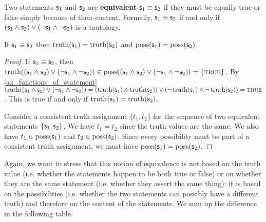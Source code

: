 \documentclass[11pt,letterpaper,fleqn]{memoir} %
\begin{document}
\begin{mathSection}

\begin{defn}
	Two statements $\mathsf{s}_1$ and $\mathsf{s}_2$ are \textbf{equivalent} $\mathsf{s}_1 \equiv \mathsf{s}_2$ if they must be equally true or false simply because of their content. Formally, $\mathsf{s}_1 \equiv \mathsf{s}_2$ if and only if $(\mathsf{s}_1 \wedge \mathsf{s}_2) \vee (\neg\mathsf{s}_1 \wedge \neg\mathsf{s}_2)$ is a tautology.
\end{defn}

\begin{coro}
	If $\mathsf{s}_1 \equiv \mathsf{s}_2$ then $\operatorname{truth}(\mathsf{s}_1) = \operatorname{truth}(\mathsf{s}_2)$ and $\operatorname{poss}(\mathsf{s}_1) = \operatorname{poss}(\mathsf{s}_2)$.
\end{coro}

\begin{proof}
	If $\mathsf{s}_1 \equiv \mathsf{s}_2$, then $\operatorname{truth}((\mathsf{s}_1 \wedge \mathsf{s}_2) \vee (\neg\mathsf{s}_1 \wedge \neg\mathsf{s}_2)) \in \operatorname{poss}((\mathsf{s}_1 \wedge \mathsf{s}_2) \vee (\neg\mathsf{s}_1 \wedge \neg\mathsf{s}_2)) = \{\textsc{true}\}$. By \ref{ax_functions_of_statement} $\operatorname{truth}((\mathsf{s}_1 \wedge \mathsf{s}_2) \vee (\neg\mathsf{s}_1 \wedge \neg\mathsf{s}_2))= (\operatorname{truth}(\mathsf{s}_1) \wedge \operatorname{truth}(\mathsf{s}_2) ) \vee (\neg\operatorname{truth}(\mathsf{s}_1) \wedge \neg\operatorname{truth}(\mathsf{s}_2)) = \textsc{true}$. This is true if and only if $\operatorname{truth}(\mathsf{s}_1) = \operatorname{truth}(\mathsf{s}_2)$.
	
	Consider a consistent truth assignment $\{t_1, t_2\}$ for the sequence of two equivalent statements $\{\mathsf{s}_1, \mathsf{s}_2\}$. We have $t_1=t_2$ since the truth values are the same. We also have $t_1 \in \operatorname{poss}(\mathsf{s}_1)$ and $t_2 \in \operatorname{poss}(\mathsf{s}_2)$. Since every possibility must be part of a consistent truth assignment, we must have $\operatorname{poss}(\mathsf{s}_1) = \operatorname{poss}(\mathsf{s}_2)$.
\end{proof}

\end{mathSection}

Again, we want to stress that this notion of equivalence is not based on the truth value (i.e. whether the statements happen to be both true or false) or on whether they are the same statement (i.e. whether they assert the same thing): it is based on the possibilities (i.e. whether the two statements can possibly have a different truth) and therefore on the content of the statements. We sum up the difference in the following table.
\end{document}

